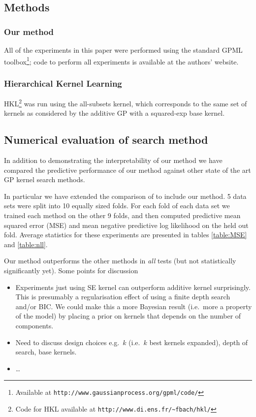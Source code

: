\documentclass[twoside]{article}
\begin{document}
\subsection{Methods}

\subsubsection{Our method}
All of the experiments in this paper were performed using the standard GPML toolbox\footnote{Available at \texttt{http://www.gaussianprocess.org/gpml/code/}}; code to perform all experiments is available at the authors' website.

\subsubsection{Hierarchical Kernel Learning}	
HKL\footnote{Code for HKL available at \texttt{http://www.di.ens.fr/\textasciitilde fbach/hkl/}} was run using the all-subsets kernel, which corresponds to the same set of kernels as considered by the additive GP with a squared-exp base kernel.

%
%
%
%
%

\subsection{Numerical evaluation of search method}

In addition to demonstrating the interpretability of our method we have compared the predictive performance of our method against other state of the art GP kernel search methods.

In particular we have extended the comparison of \cite{duvenaud2011additive11} to include our method.
5 data sets were split into 10 equally sized folds.
For each fold of each data set we trained each method on the other 9 folds, and then computed predictive mean squared error (MSE) and mean negative predictive log likelihood on the held out fold.
Average statistics for these experiments are presented in tables \ref{table:MSE} and \ref{table:nll}.




Our method outperforms the other methods in \emph{all} tests (but not statistically significantly yet).
Some points for discussion
\begin{itemize}
\item Experiments just using SE kernel can outperform additive kernel surprisingly. This is presumably a regularisation effect of using a finite depth search and/or BIC. We could make this a more Bayesian result (i.e.~more a property of the model) by placing a prior on kernels that depends on the number of components.
\item Need to discuss design choices e.g.~$k$ (i.e.~$k$ best kernels expanded), depth of search, base kernels.
\item \ldots
\end{itemize}
\end{document}
